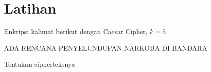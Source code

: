 \documentclass{article}
\begin{document}

\section*{Latihan}

Enkripsi kalimat berikut dengan Caesar Cipher, $k = 5$

\begin{center}
ADA RENCANA PENYELUNDUPAN NARKOBA DI BANDARA
\end{center}

Tentukan cipherteksnya
\end{document}
